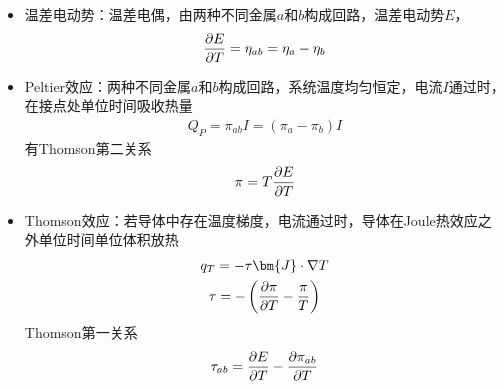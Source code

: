 \begin{itemize}
    \item 温差电动势：温差电偶，由两种不同金属$a$和$b$构成回路，温差电动势$E$，
    \begin{gather*}
        \frac{\partial E}{\partial T} = \eta_{ab} = \eta_a - \eta_b
    \end{gather*}
    \item Peltier效应：两种不同金属$a$和$b$构成回路，系统温度均匀恒定，电流$I$通过时，在接点处单位时间吸收热量
    \begin{gather*}
        Q_P = \pi_{ab} I = (\pi_a - \pi_b) I
    \end{gather*}
    有Thomson第二关系
    \begin{gather*}
        \pi = T \frac{\partial E}{\partial T}
    \end{gather*}
    \item Thomson效应：若导体中存在温度梯度，电流通过时，导体在Joule热效应之外单位时间单位体积放热
    \begin{gather*}
        q_T=- \tau \bm{J} \cdot \nabla T
        \\
        \tau = - \left(\pt{\pi}{T} - \frac{\pi}{T}\right)
    \end{gather*}
    Thomson第一关系
    \begin{gather*}
        \tau_{ab} = \frac{\partial E}{\partial T} - \frac{\partial \pi_{ab}}{\partial T}
    \end{gather*}
\end{itemize}